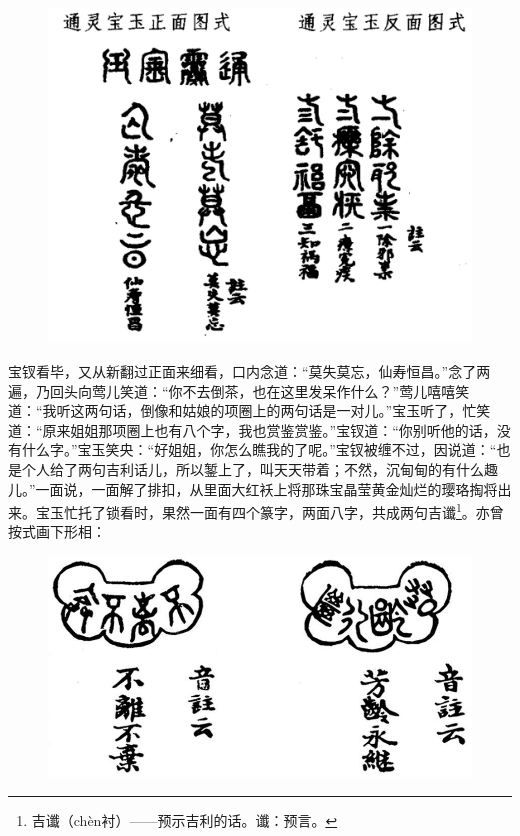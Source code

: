 \begin{figure}[htb]
    \centering
    \includegraphics[scale=0.6]{picture/红楼梦1.PNG}
\end{figure}
\par 宝钗看毕，又从新翻过正面来细看，口内念道：“莫失莫忘，仙寿恒昌。”念了两遍，乃回头向莺儿笑道：“你不去倒茶，也在这里发呆作什么？”莺儿嘻嘻笑道：“我听这两句话，倒像和姑娘的项圈上的两句话是一对儿。”宝玉听了，忙笑道：“原来姐姐那项圈上也有八个字，我也赏鉴赏鉴。”宝钗道：“你别听他的话，没有什么字。”宝玉笑央：“好姐姐，你怎么瞧我的了呢。”宝钗被缠不过，因说道：“也是个人给了两句吉利话儿，所以錾上了，叫天天带着；不然，沉甸甸的有什么趣儿。”一面说，一面解了排扣，从里面大红袄上将那珠宝晶莹黄金灿烂的璎珞掏将出来。宝玉忙托了锁看时，果然一面有四个篆字，两面八字，共成两句吉谶\footnote{吉谶（chèn衬）——预示吉利的话。谶：预言。}。亦曾按式画下形相：
\begin{figure}[htb]
    \centering
    \includegraphics[scale=0.4]{picture/红楼梦2.jpeg}
\end{figure}
